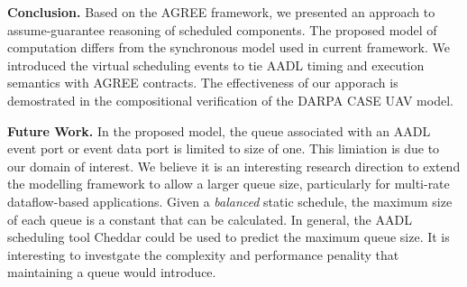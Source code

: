 {\bf Conclusion.}
Based on the AGREE framework, we presented an approach to assume-guarantee reasoning of scheduled components. The proposed model of computation differs from the synchronous model used in current framework. We introduced the virtual scheduling events to tie AADL timing and execution semantics with AGREE contracts. The effectiveness of our apporach is demostrated in the compositional verification of the DARPA CASE UAV model.

{\bf Future Work.}
In the proposed model, the queue associated with an AADL event port or event data port is limited to size of one. This limiation is due to our domain of interest. We believe it is an interesting research direction to extend the modelling framework to allow a larger queue size, particularly for multi-rate dataflow-based applications. Given a \emph{balanced} static schedule, the maximum size of each queue is a constant that can be calculated. In general, the AADL scheduling tool Cheddar could be used to predict the maximum queue size. It is interesting to investgate the complexity and performance penality that maintaining a queue would introduce.
